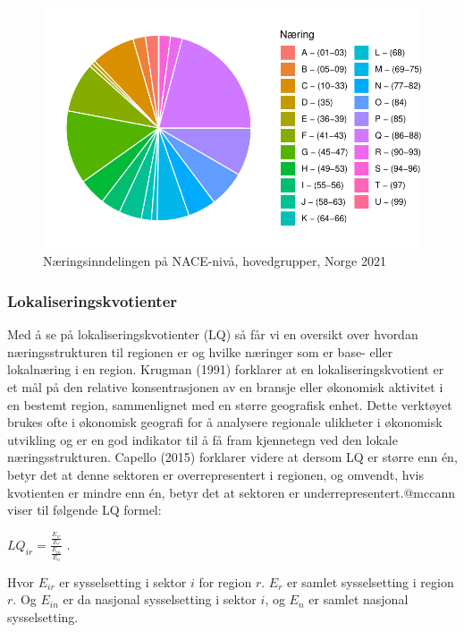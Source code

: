 \documentclass[
]{article}
\begin{document}
\begin{figure}[H]

{\centering \includegraphics{Masteroppgave_files/figure-pdf/fig-kake-norge-1.pdf}

}

\caption{\label{fig-kake-norge}Næringsinndelingen på NACE-nivå,
hovedgrupper, Norge 2021}

\end{figure}

\hypertarget{lokaliseringskvotienter}{%
\subsubsection{Lokaliseringskvotienter}\label{lokaliseringskvotienter}}

Med å se på lokaliseringskvotienter (LQ) så får vi en oversikt over
hvordan næringsstrukturen til regionen er og hvilke næringer som er
base- eller lokalnæring i en region. Krugman (1991) forklarer at en
lokaliseringskvotient er et mål på den relative konsentrasjonen av en
bransje eller økonomisk aktivitet i en bestemt region, sammenlignet med
en større geografisk enhet. Dette verktøyet brukes ofte i økonomisk
geografi for å analysere regionale ulikheter i økonomisk utvikling og er
en god indikator til å få fram kjennetegn ved den lokale
næringsstrukturen. Capello (2015) forklarer videre at dersom LQ er
større enn én, betyr det at denne sektoren er overrepresentert i
regionen, og omvendt, hvis kvotienten er mindre enn én, betyr det at
sektoren er underrepresentert.@mccann viser til følgende LQ formel:

\(LQ_{ir} = \frac{\frac{E_{ir}}{E_r}}{\frac{E_{in}}{E_n}}\) .

Hvor \(E_{ir}\) er sysselsetting i sektor \(i\) for region \(r\).
\(E_r\) er samlet sysselsetting i region \(r\). Og \(E_{in}\) er da
nasjonal sysselsetting i sektor \(i\), og \(E_n\) er samlet nasjonal
sysselsetting.
\end{document}
